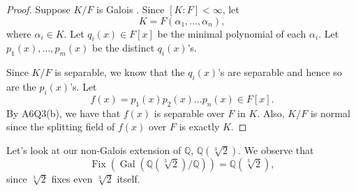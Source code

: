\documentclass[notoc,notitlepage,nobib]{tufte-book}
\DeclareMathOperator{\Gal}{Gal}
\DeclareMathOperator{\Fix}{Fix}
\begin{document}
\begin{proof}
  \noindent
   Suppose $K / F$ is Galois . Since $[ K : F ] < \infty$, let
  \begin{equation*}
    K = F(\alpha_1, \ldots, \alpha_n),
  \end{equation*}
  where $\alpha_i \in K$. Let $q_i(x) \in F[x]$ be the minimal polynomial of
  each $\alpha_i$. Let $p_1(x), \ldots, p_m(x)$ be the distinct $q_i(x)$'s.

  Since $K / F$ is separable, we know that the $q_i(x)$'s are separable and
  hence so are the $p_i(x)$'s. Let
  \begin{equation*}
    f(x) = p_1(x) p_2(x) \hdots p_n(x) \in F[x].
  \end{equation*}
  By A6Q3(b), we have that $f(x)$ is separable over $F$ in $K$. Also, $K / F$ is
  normal since the splitting field of $f(x)$ over $F$ is exactly $K$.
\end{proof}

\begin{eg}
  Let's look at our non-Galois extension of $\mathbb{Q}$,
  $\mathbb{Q}(\sqrt[3]{2})$. We observe that
  \begin{equation*}
    \Fix ( \Gal( \mathbb{Q}(\sqrt[3]{2}) / \mathbb{Q} ) ) =
    \mathbb{Q}(\sqrt[3]{2}),
  \end{equation*}
  since $\sqrt[3]{2}$ fixes even $\sqrt[3]{2}$ itself.
\end{eg}
\end{document}
